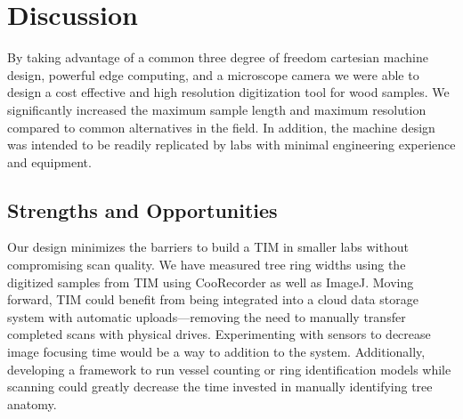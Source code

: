 \documentclass[a4paper,12pt]{article}
\begin{document}
\section{Discussion} %
By taking advantage of a common three degree of freedom cartesian machine design, powerful edge computing, and a microscope camera we were able to design a cost effective and high resolution digitization tool for wood samples. 
We significantly increased the maximum sample length and maximum resolution compared to common alternatives in the field. 
In addition, the machine design was intended to be readily replicated by labs with minimal engineering experience and equipment. 

\subsection{Strengths and Opportunities}
Our design minimizes the barriers to build a TIM in smaller labs without compromising scan quality. We have measured tree ring widths using the digitized samples from TIM using CooRecorder as well as ImageJ.
Moving forward, TIM could benefit from being integrated into a cloud data storage system with automatic uploads---removing the need to manually transfer completed scans with physical drives.
Experimenting with sensors to decrease image focusing time would be a way to addition to the system. Additionally, developing a framework to run vessel counting or ring identification models while scanning could greatly decrease the time invested in manually identifying tree anatomy. %



\end{document}
